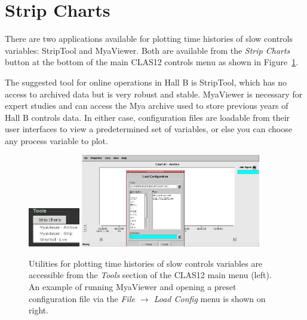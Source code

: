 \documentclass[amsmath,amssymb,notitlepage,11pt]{revtex4}
\begin{document}
\section{Strip Charts}
There are two applications available for plotting time histories of slow controls variables:  StripTool and MyaViewer.  Both are available from the {\em Strip Charts} button at the bottom of the main CLAS12 controls menu as shown in Figure~\ref{fig:strips}.

The suggested tool for online operations in Hall B is StripTool, which has no access to archived data but is very robust and stable.  MyaViewer is necessary for expert studies and can access the Mya archive used to store previous years of Hall B controls data.  In either case, configuration files are loadable from their user interfaces to view a predetermined set of variables, or else you can choose any process variable to plot.

\begin{figure}[htbp]\centering
    \includegraphics[width=0.2\textwidth]{pics/strips}
    \includegraphics[width=0.7\textwidth]{pics/myaviewer}
    \caption{Utilities for plotting time histories of slow controls variables are accessible from the {\em Tools} section of the CLAS12 main menu (left).  An example of running MyaViewer and opening a preset configuration file via the {\em File $\rightarrow$ Load Config} menu is shown on right.\label{fig:strips}}
\end{figure}
\end{document}
